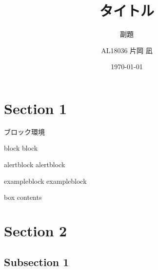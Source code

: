 \documentclass[aspectratio=169, dvipdfmx, 14pt, xcolor={svgnames,dvipsnames}]{beamer}
\title[Short title]{タイトル}
\subtitle{副題}
\author[Kataoka Nagi]{AL18036 片岡 凪}
\institute[AL18036]{芝浦工業大学 工学部 情報工学科 4年}
\date{\today}
\begin{document}

\maketitle


\section{Section 1}


\begin{frame}{ブロック環境}
  \begin{block}{block}
    block
  \end{block}
  \begin{alertblock}{alertblock}
    alertblock
  \end{alertblock}
  \begin{exampleblock}{exampleblock}
    exampleblock
  \end{exampleblock}
  \begin{tcolorbox}[colframe=green,
      colback=green!10!white,
      colbacktitle=green!40!white,
      coltitle=black, fonttitle=\bfseries,
      title=My box]
    box contents
  \end{tcolorbox}
\end{frame}


\section{Section 2}


\subsection{Subsection 1}

\end{document}
